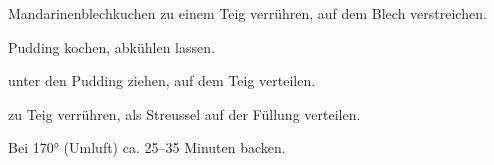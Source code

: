 \begin{recipe}{Mandarinenblechkuchen}
  zu einem Teig verrühren, auf dem Blech verstreichen.
  
  Pudding kochen, abkühlen lassen.
  
  unter den Pudding ziehen, auf dem Teig verteilen.
  
  zu Teig verrühren, als Streussel auf der Füllung verteilen.
  
  Bei 170° (Umluft) ca. 25--35 Minuten backen.  
\end{recipe}
